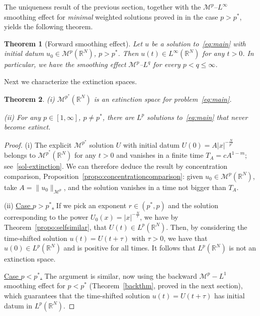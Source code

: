 \documentclass[leqno,12pt]{amsart}
\newtheorem{theorem}{Theorem}[section]
\theoremstyle{definition}
\theoremstyle{remark}
\numberwithin{equation}{section}
\begin{document}
The uniqueness result of the previous section, together with the $\mathcal{M}^p$--$L^\infty$ smoothing effect for \emph{minimal} weighted solutions proved in \cite{vazquez:Mp_SE} in the case $p>p^*$, yields the following theorem.

\begin{theorem}[Forward smoothing effect]\label{thm:Forward Mp smoothing effect}
   Let $u$ be a solution to~\eqref{eq:main} with initial datum $u_0\in 
   \mathcal{M}^p(\mathbb{R}^N)$, $p>p^*$. Then $u(t)\in L^\infty(\mathbb{R}^N)$ for any $t>0$. In particular, we have the smoothing effect $\mathcal{M}^p$--$L^q$ for every $p<q\le\infty$. 
\end{theorem}

Next we characterize the extinction spaces.

\begin{theorem}\label{extinction:Lp and Mp}
    \textup{(i)} $\mathcal{M}^{p^*}(\mathbb{R}^N)$ is an extinction space for problem~\eqref{eq:main}.
    
    \noindent \textup{(ii)} For any $p\in [1,\infty]$, $p\neq p^*$, there are $L^p$ solutions to~\eqref{eq:main} that never become extinct.
\end{theorem}

\begin{proof} (i) The explicit $\mathcal{M}^{p^*}$ solution $U$ with initial datum $U(0)=A|x|^{-\frac N{p^*}}$ belongs to $\mathcal{M}^{p^*}(\mathbb{R}^N)$ for any $t>0$ and vanishes in a finite time $T_A=cA^{1-m}$; see~\eqref{sol-extinction}. We can therefore deduce the result by concentration comparison, Proposition~\ref{propo:concentrationcomparison}: given $u_0\in\mathcal{M}^{p}(\mathbb{R}^N)$, take $A=\|u_0\|_{\mathcal{M}^p}$, and the solution vanishes in a time not bigger than $T_A$.

\noindent (ii) \underline{Case $p>p^*$.} If we pick an exponent $r\in(p^*,p)$ and the solution corresponding to the power $U_0(x)=|x|^{-\frac Nr}$, we have by Theorem~\ref{propo:selfsimilar}, that $U(t) \in L^{p}(\mathbb{R}^N)$. Then, by considering the time-shifted solution $u(t) = U(t+\tau)$ with $\tau > 0$, we have that $u(0) \in L^{p}(\mathbb{R}^N)$ and is positive for all times. It follows that $L^{p}(\mathbb{R}^N)$ is not an extinction space.


\noindent\underline{Case $p<p^*$.} The argument is similar, now using the backward  $\mathcal{M}^p-L^1$ smoothing effect for $p<p^*$ (Theorem~\ref{backthm}, proved in the next section), which guarantees that the time-shifted solution $u(t)=U(t+\tau)$ has initial datum in $L^p(\mathbb{R}^N)$.
\end{proof}
\end{document}
